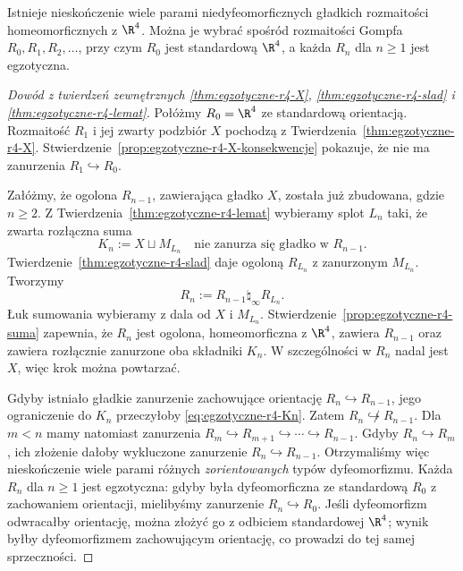 \begin{twierdzenie}
\label{thm:egzotyczne-r4-nieskonczenie}
Istnieje nieskończenie wiele parami niedyfeomorficznych
gładkich rozmaitości homeomorficznych z $\R^4$.
Można je wybrać spośród rozmaitości Gompfa
$R_0,R_1,R_2,\ldots$, przy czym $R_0$ jest
standardową $\R^4$, a każda $R_n$ dla $n\geq1$
jest egzotyczna.
\end{twierdzenie}
\begin{proof}[Dowód z twierdzeń zewnętrznych
\ref{thm:egzotyczne-r4-X},
\ref{thm:egzotyczne-r4-slad} i
\ref{thm:egzotyczne-r4-lemat}]
Połóżmy $R_0=\R^4$ ze standardową orientacją.
Rozmaitość $R_1$ i jej zwarty podzbiór $X$
pochodzą z Twierdzenia~\ref{thm:egzotyczne-r4-X}.
Stwierdzenie~\ref{prop:egzotyczne-r4-X-konsekwencje}
pokazuje, że nie ma zanurzenia $R_1\hookrightarrow R_0$.

Załóżmy, że ogolona $R_{n-1}$, zawierająca
gładko $X$, została już zbudowana, gdzie $n\geq2$.
Z Twierdzenia~\ref{thm:egzotyczne-r4-lemat}
wybieramy splot $L_n$ taki, że zwarta
rozłączna suma
\begin{equation}\label{eq:egzotyczne-r4-Kn}
 K_n:=X\sqcup M_{L_n}
 \quad\text{nie zanurza się gładko w }R_{n-1}.
\end{equation}
Twierdzenie~\ref{thm:egzotyczne-r4-slad}
daje ogoloną $R_{L_n}$ z zanurzonym
$M_{L_n}$. Tworzymy
\begin{equation}\label{eq:egzotyczne-r4-Rn}
 R_n:=R_{n-1}\mathbin{\natural_\infty}R_{L_n}.
\end{equation}
Łuk sumowania wybieramy z dala od $X$ i
$M_{L_n}$. Stwierdzenie~\ref{prop:egzotyczne-r4-suma}
zapewnia, że $R_n$ jest ogolona,
homeomorficzna z $\R^4$, zawiera $R_{n-1}$
oraz zawiera rozłącznie zanurzone oba składniki
$K_n$. W szczególności w $R_n$ nadal jest $X$,
więc krok można powtarzać.

Gdyby istniało gładkie zanurzenie zachowujące
orientację $R_n\hookrightarrow R_{n-1}$,
jego ograniczenie do $K_n$ przeczyłoby
\eqref{eq:egzotyczne-r4-Kn}. Zatem
$R_n\not\hookrightarrow R_{n-1}$.
Dla $m<n$ mamy natomiast zanurzenia
$R_m\hookrightarrow R_{m+1}\hookrightarrow
\cdots\hookrightarrow R_{n-1}$. Gdyby
$R_n\hookrightarrow R_m$, ich złożenie
dałoby wykluczone zanurzenie
$R_n\hookrightarrow R_{n-1}$. Otrzymaliśmy
więc nieskończenie wiele parami różnych
\emph{zorientowanych} typów dyfeomorfizmu.
Każda $R_n$ dla $n\geq1$ jest egzotyczna:
gdyby była dyfeomorficzna ze standardową
$R_0$ z zachowaniem orientacji, mielibyśmy
zanurzenie $R_n\hookrightarrow R_0$. Jeśli
dyfeomorfizm odwracałby orientację, można
złożyć go z odbiciem standardowej $\R^4$;
wynik byłby dyfeomorfizmem zachowującym
orientację, co prowadzi do tej samej sprzeczności.


\end{proof}

